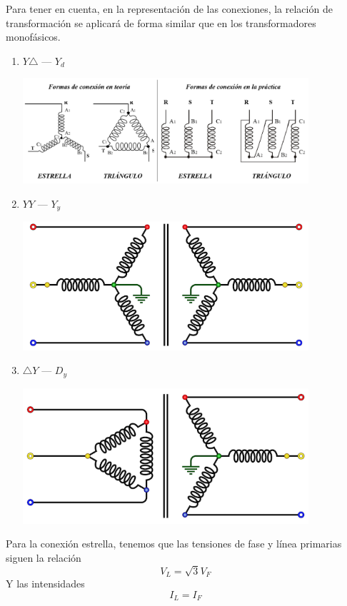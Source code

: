 \documentclass[11pt]{report}
\begin{document}
Para tener en cuenta, en la representación de las conexiones, la relación de
transformación se aplicará de forma similar que en los transformadores
monofásicos.
\pagebreak
\begin{enumerate}
  \item $Y \triangle$ --- $Y_d$
        \begin{center}
          \includegraphics[width=400px]{estrella-triangulo-trafo.png}
        \end{center}
  \item $YY$ --- $Y_y$
        \begin{center}
          \includegraphics[width=400px]{estrella-estrella-trafo.png}
        \end{center}

  \item $\triangle Y$ --- $D_y$
        \begin{center}
          \includegraphics[width=400px]{triangulo-estrella-trafo.png}
        \end{center}
\end{enumerate}

Para la conexión estrella, tenemos que las tensiones de fase y línea primarias
siguen la relación
\begin{equation*}
  V_{L} = \sqrt{3} V_{F}
\end{equation*}
Y las intensidades
\begin{equation*}
  I_{L} = I_{F}
\end{equation*}
\end{document}
